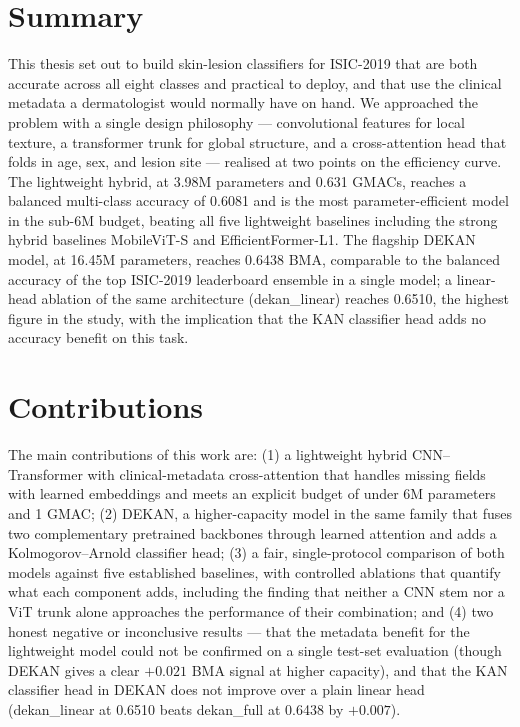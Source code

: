 \section{Summary}

This thesis set out to build skin-lesion classifiers for ISIC-2019 that are both
accurate across all eight classes and practical to deploy, and that use the
clinical metadata a dermatologist would normally have on hand. We approached the
problem with a single design philosophy --- convolutional features for local
texture, a transformer trunk for global structure, and a cross-attention head
that folds in age, sex, and lesion site --- realised at two points on the
efficiency curve. The lightweight hybrid, at 3.98M parameters and 0.631 GMACs,
reaches a balanced multi-class accuracy of 0.6081 and is the most
parameter-efficient model in the sub-6M budget, beating all five lightweight
baselines including the strong hybrid baselines MobileViT-S and
EfficientFormer-L1. The flagship DEKAN model, at 16.45M parameters, reaches 0.6438 BMA, comparable
to the balanced accuracy of the top ISIC-2019 leaderboard ensemble in a single
model; a linear-head ablation of the same architecture (dekan\_linear) reaches
0.6510, the highest figure in the study, with the implication that the KAN
classifier head adds no accuracy benefit on this task.

\section{Contributions}

The main contributions of this work are: (1) a lightweight hybrid
CNN--Transformer with clinical-metadata cross-attention that handles missing
fields with learned embeddings and meets an explicit budget of under 6M
parameters and 1 GMAC; (2) DEKAN, a higher-capacity model in the same family
that fuses two complementary pretrained backbones through learned attention and
adds a Kolmogorov--Arnold classifier head; (3) a fair, single-protocol
comparison of both models against five established baselines, with controlled
ablations that quantify what each component adds, including the finding that
neither a CNN stem nor a ViT trunk alone approaches the performance of their
combination; and (4) two honest negative or inconclusive results --- that the
metadata benefit for the lightweight model could not be confirmed on a single
test-set evaluation (though DEKAN gives a clear $+0.021$ BMA signal at higher
capacity), and that the KAN classifier head in DEKAN does not improve over a
plain linear head (dekan\_linear at 0.6510 beats dekan\_full at 0.6438 by
$+0.007$).

